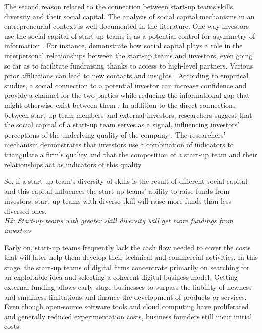 \documentclass[12pt]{article}
\begin{document}
The second reason related to the connection between start-up teams'skills diversity and their social capital. The analysis of social capital mechanisms in an entrepreneurial context is well documented in the literature. One way investors use the social capital of start-up teams is as a potential control for asymmetry of information \citep{ko2018signaling}. For instance, \citet{shane2002network} demonstrate how social capital plays a role in the interpersonal relationships between the start-up teams and investors, even going so far as to facilitate fundraising thanks to access to high-level partners. Various prior affiliations can lead to new contacts and insights \citep{beckman2007early}. According to empirical studies, a social connection to a potential investor can increase confidence and provide a channel for the two parties while reducing the informational gap that might otherwise exist between them \citep{huang2017resources, shane2002network, shane2002organizational}. In addition to the direct connections between start-up team members and external investors, researchers suggest that the social capital of a start-up team serves as a signal, influencing investors' perceptions of the underlying quality of the company \citep{hoenig2015quality, shane2002organizational}. The researchers' mechanism demonstrates that investors use a combination of indicators to triangulate a firm's quality and that the composition of a start-up team and their relationships act as indicators of this quality \citep{plummer2016better, semrau2014exactly}

So, if a start-up team's diversity of skills is the result of different social capital and this capital influences the start-up teams' ability to raise funds from investors, start-up teams with diverse skill will raise more funds than less diversed ones. \\

\noindent \textit{H2: Start-up teams with greater skill diversity will get more fundings from investors}

Early on, start-up teams frequently lack the cash flow needed to cover the costs that will later help them develop their technical and commercial activities. In this stage, the start-up teams of digital firms concentrate primarily on searching for an exploitable idea and selecting a coherent digital business model. Getting external funding allows early-stage businesses to surpass the liability of newness and smallness limitations and finance the development of products or services. Even though open-source software tools and cloud computing have proliferated and generally reduced experimentation costs, business founders still incur initial costs.
\end{document}
